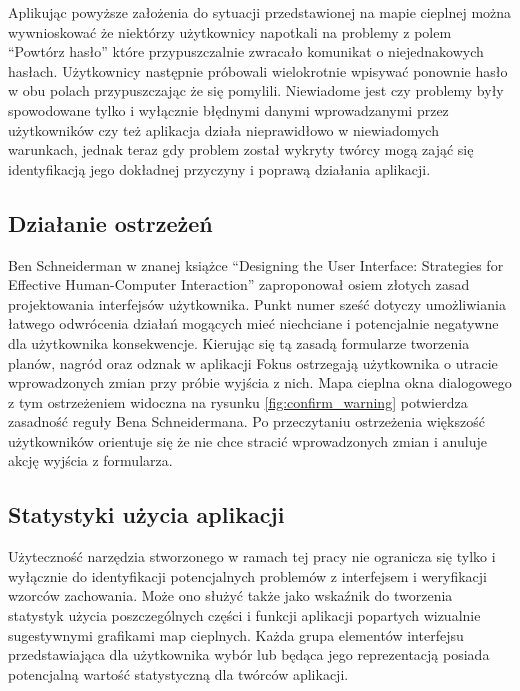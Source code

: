Aplikując powyższe założenia do sytuacji przedstawionej na mapie cieplnej można wywnioskować że niektórzy użytkownicy napotkali na problemy z polem ``Powtórz hasło'' które przypuszczalnie zwracało komunikat o niejednakowych hasłach. Użytkownicy następnie próbowali wielokrotnie wpisywać ponownie hasło w obu polach przypuszczając że się pomylili. Niewiadome jest czy problemy były spowodowane tylko i wyłącznie błędnymi danymi wprowadzanymi przez użytkowników czy też aplikacja działa nieprawidłowo w niewiadomych warunkach, jednak teraz gdy problem został wykryty twórcy mogą zająć się identyfikacją jego dokładnej przyczyny i poprawą działania aplikacji.

\bigskip
{}

\subsection{Działanie ostrzeżeń}
Ben Schneiderman w znanej książce ``Designing the User Interface: Strategies for Effective Human-Computer Interaction'' \cite{Designing_IU} zaproponował osiem złotych zasad projektowania interfejsów użytkownika. Punkt numer sześć dotyczy umożliwiania łatwego odwrócenia działań mogących mieć niechciane i potencjalnie negatywne dla użytkownika konsekwencje. Kierując się tą zasadą formularze tworzenia planów, nagród oraz odznak w aplikacji Fokus ostrzegają użytkownika o utracie wprowadzonych zmian przy próbie wyjścia z nich. Mapa cieplna okna dialogowego z tym ostrzeżeniem widoczna na rysunku \ref{fig:confirm_warning} potwierdza zasadność reguły Bena Schneidermana. Po przeczytaniu ostrzeżenia większość użytkowników orientuje się że nie chce stracić wprowadzonych zmian i anuluje akcję wyjścia z formularza.

\bigskip
{}

\subsection{Statystyki użycia aplikacji}
Użyteczność narzędzia stworzonego w ramach tej pracy nie ogranicza się tylko i wyłącznie do identyfikacji potencjalnych problemów z interfejsem i weryfikacji wzorców zachowania. Może ono służyć także jako wskaźnik do tworzenia statystyk użycia poszczególnych części i funkcji aplikacji popartych wizualnie sugestywnymi grafikami map cieplnych. Każda grupa elementów interfejsu przedstawiająca dla użytkownika wybór lub będąca jego reprezentacją posiada potencjalną wartość statystyczną dla twórców aplikacji.

